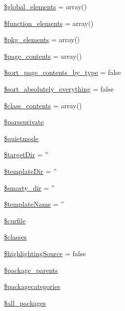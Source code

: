 \begin{DoxyCompactItemize}
\item 
\hyperlink{class_converter_a1576ce68d2aafc0af7043d6f751c3eb7}{\$global\-\_\-elements} = array()
\item 
\hyperlink{class_converter_a47fa3296f67608f4eaefa27f2b058039}{\$function\-\_\-elements} = array()
\item 
\hyperlink{class_converter_af833d646cb2d71e00831b24d1cbd9cdf}{\$pkg\-\_\-elements} = array()
\item 
\hyperlink{class_converter_a52fe977b692aa0c2a45b5b372cc7ce14}{\$page\-\_\-contents} = array()
\item 
\hyperlink{class_converter_ab5dae87e1968b35e37687a763216a835}{\$sort\-\_\-page\-\_\-contents\-\_\-by\-\_\-type} = false
\item 
\hyperlink{class_converter_a40eea215f3b8eaec5c134f45f62aa100}{\$sort\-\_\-absolutely\-\_\-everything} = false
\item 
\hyperlink{class_converter_a2673a6f968cf40435ee37f829caaa0e3}{\$class\-\_\-contents} = array()
\item 
\hyperlink{class_converter_a8de99eed8da296ff730545219e284e78}{\$parseprivate}
\item 
\hyperlink{class_converter_a7725fd0a145ccfe320caaba1dc15b6e6}{\$quietmode}
\item 
\hyperlink{class_converter_aae33ae3051c6f350bb69a0631ade81d9}{\$target\-Dir} = ''
\item 
\hyperlink{class_converter_a6547ce63e0b4a48fb9414d71c2f64a7c}{\$template\-Dir} = ''
\item 
\hyperlink{class_converter_afc2adf23943f2cf6a93997e5ab9bca62}{\$smarty\-\_\-dir} = ''
\item 
\hyperlink{class_converter_a811dd317a408c35d379d08441ad8a982}{\$template\-Name} = ''
\item 
\hyperlink{class_converter_a84352b4d740a45279b61228864b9b5e7}{\$curfile}
\item 
\hyperlink{class_converter_a4212f1eca3e4faf764728d56bc13dfd3}{\$classes}
\item 
\hyperlink{class_converter_a272c13ae598060163f6e8749a4c12904}{\$highlighting\-Source} = false
\item 
\hyperlink{class_converter_acf9ccb8aea606d86cfed6693a6349bc3}{\$package\-\_\-parents}
\item 
\hyperlink{class_converter_ad46f1d4e924726751a32d205f64ccd80}{\$packagecategories}
\item 
\hyperlink{class_converter_a2239e82b48c3085715b2bade1d08779c}{\$all\-\_\-packages}
\item 

\end{DoxyCompactItemize}
